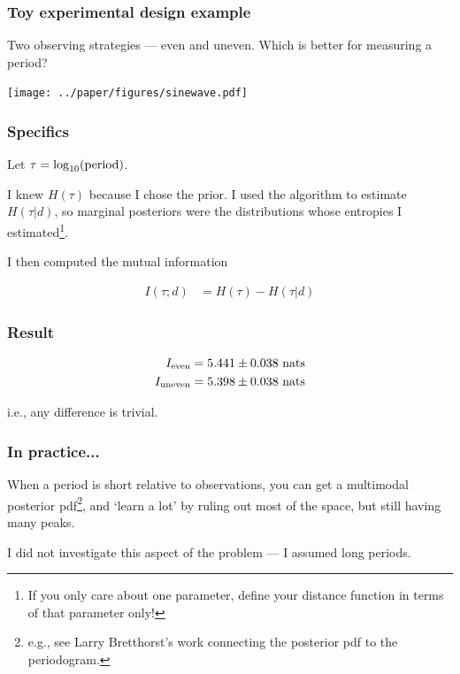 \documentclass{beamer}
\begin{document}
\begin{frame}
\frametitle{Toy experimental design example}
Two observing strategies --- even and uneven.
Which is better for measuring a period?

\begin{center}
\texttt{[image: ../paper/figures/sinewave.pdf]}
\end{center}

\end{frame}


\begin{frame}
\frametitle{Specifics}
Let $\tau = \log_{10}(\textnormal{period})$.\vspace{0.5em}

I knew $H(\tau)$ because I chose
the prior. I used the algorithm to estimate $H(\tau | d)$,
so marginal posteriors
were the distributions whose entropies I estimated\footnote{If you only
care about one parameter, define your distance function in terms of that
parameter only!}.\vspace{0.5em}

I then computed the mutual information
\vspace{0.5em}

\begin{align}
I(\tau; d) &= H(\tau) - H(\tau | d)
\end{align}

\end{frame}

\begin{frame}
\frametitle{Result}

\begin{align}
I_{\rm even}   &= 5.441 \pm 0.038 \textnormal{ nats}\\
I_{\rm uneven} &= 5.398 \pm 0.038 \textnormal{ nats}
\end{align}

i.e., any difference is trivial.

\end{frame}


\begin{frame}
\frametitle{In practice...}

When a period is short relative to observations, you can get a multimodal
posterior pdf\footnote{e.g., see Larry Bretthorst's work connecting
the posterior pdf to the periodogram.},
and `learn a lot' by ruling out most of the space, but still
having many peaks.\vspace{0.5em}

I did not investigate this aspect of the problem --- I assumed long periods.

\end{frame}
\end{document}

